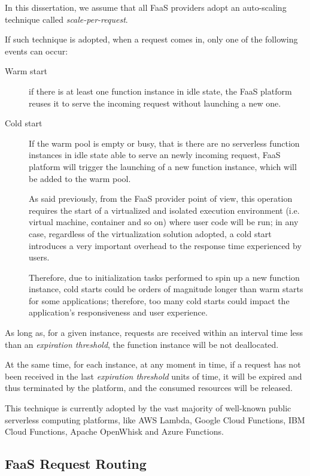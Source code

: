 \documentclass[12pt,a4paper]{report}
\theoremstyle{definition}
\begin{document}
In this dissertation, we assume that all FaaS providers adopt an auto-scaling technique called \textit{scale-per-request}.

If such technique is adopted, when a request comes in, only one of the following events can occur:

\begin{description}
	
	\item[Warm start] if there is at least one function instance in idle state, the FaaS platform reuses it to serve the incoming request without launching a new one.
	
	\item[Cold start] If the warm pool is empty or busy, that is there are no serverless function instances in idle state able to serve an newly incoming request, FaaS platform will trigger the launching of a new function instance, which will be added to the warm pool.
	
	As said previously, from the FaaS provider point of view, this operation requires the start of a virtualized and isolated execution environment (i.e. virtual machine, container and so on) where user code will be run; in any case, regardless of the virtualization solution adopted, a cold start introduces a very important overhead to the response time experienced by users. 
	
	Therefore, due to initialization tasks performed to spin up a new function instance, cold starts could be orders of magnitude longer than warm starts for some applications; therefore, too many cold starts could impact the application’s responsiveness and user experience.
\end{description} 

As long as, for a given instance, requests are received within an interval time less than an \textit{expiration threshold}, the function instance will be not deallocated.

At the same time, for each instance, at any moment in time, if a request has not been received in the last \textit{expiration threshold} units of time, it will be expired and thus terminated by the platform, and the consumed resources will be released. 

This technique is currently adopted by the vast majority of well-known public serverless computing platforms, like AWS Lambda, Google Cloud Functions, IBM Cloud Functions, Apache OpenWhisk and Azure Functions. 

\subsection{FaaS Request Routing}
\end{document}
